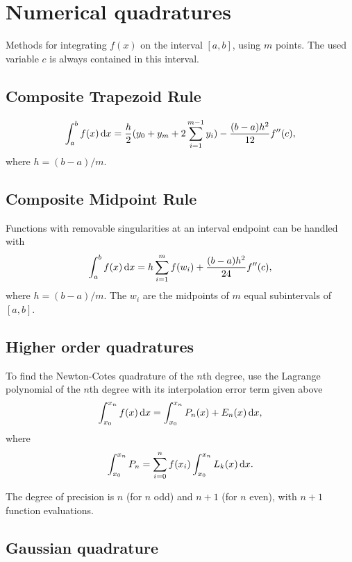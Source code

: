 \section{Numerical quadratures}
Methods for integrating $f(x)$ on the interval $[a,b]$, using $m$ points. The used variable $c$ is always contained in this interval.

\subsection{Composite Trapezoid Rule}
$$
\int_{a}^{b} f(x) \mathop{}\!\mathrm{d}{x} = \frac{h}{2}(y_0+y_m + 2\sum_{i=1}^{m-1}y_i) - \frac{(b-a)h^2}{12}f''(c),
$$
where $h = (b-a)/m$.

\subsection{Composite Midpoint Rule}
Functions with removable singularities at an interval endpoint can be handled with
$$
\int_{a}^{b} f(x) \mathop{}\!\mathrm{d}{x} = h \sum_{i=1}^mf(w_i) + \frac{(b-a)h^2}{24}f''(c),
$$
where $h = (b - a)/m$. The $w_i$ are the midpoints of $m$ equal subintervals of $[a,b]$.

\subsection{Higher order quadratures}


To find the Newton-Cotes quadrature of the $n$th degree, use the Lagrange polynomial of the $n$th degree with its interpolation error term given above
$$
\int_{x_0}^{x_n} f(x) \mathop{}\!\mathrm{d}{x} = \int_{x_0}^{x_n} P_{n}(x) + E_n(x) \mathop{}\!\mathrm{d}{x}, 
$$
where
$$
\int_{x_0}^{x_n} P_{n} = \sum_{i=0}^n f(x_i) \int_{x_0}^{x_n} L_k(x) \mathop{}\!\mathrm{d}{x}.
$$

The degree of precision is $n$ (for $n$ odd) and $n+1$ (for $n$ even), with $n+1$ function evaluations.

\subsection{Gaussian quadrature}

